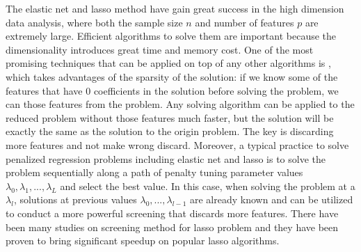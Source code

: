 The elastic net and lasso method have gain great success in the high dimension data analysis, where both the sample size $n$ and number of features $p$ are extremely large. Efficient algorithms to solve them are important because the dimensionality introduces great time and memory cost. One of the most promising techniques that can be applied on top of any other algorithms is , which takes advantages of the sparsity of the solution: if we know some of the features that have 0 coefficients in the solution before solving the problem, we can  those features from the problem. Any solving algorithm can be applied to the reduced problem without those features much faster, but the solution will be exactly the same as the solution to the origin problem. The key is discarding more features and not make wrong discard. Moreover, a typical practice to solve penalized regression problems including elastic net and lasso is to solve the problem sequentially along a path of penalty tuning parameter values $\lambda_0,\lambda_1,...,\lambda_L$ and select the best value. In this case, when solving the problem at a $\lambda_l$, solutions at previous values $\lambda_0,...,\lambda_{l-1}$ are already known and can be utilized to conduct a more powerful screening that discards more features. There have been many studies on screening method for lasso problem \citep{ghaoui2010safe,Tibshirani2012,wang2013lasso,fercoq2015,Zeng2021,wang2021adaptive} and they have been proven to bring significant speedup on popular lasso algorithms.

